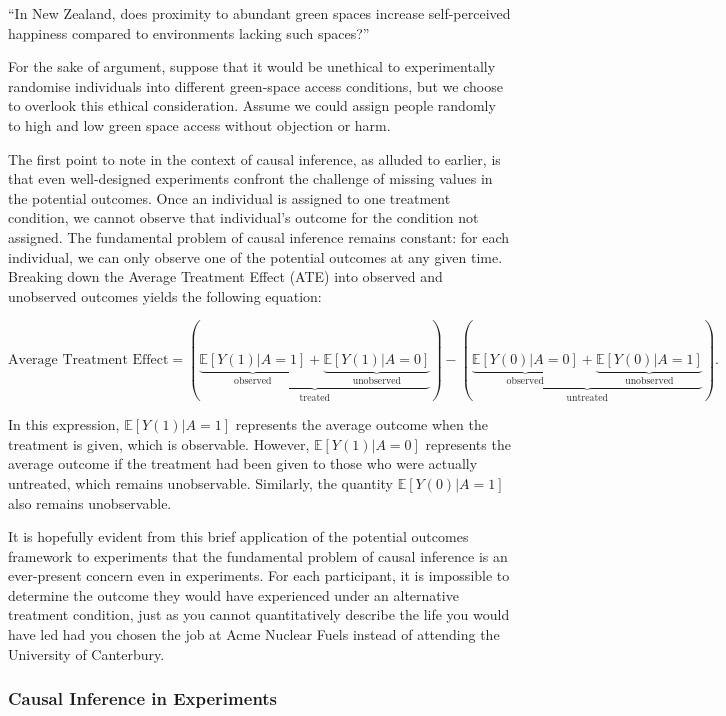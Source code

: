 \documentclass[
  singlecolumn]{article}
\begin{document}
``In New Zealand, does proximity to abundant green spaces increase
self-perceived happiness compared to environments lacking such spaces?''

For the sake of argument, suppose that it would be unethical to
experimentally randomise individuals into different green-space access
conditions, but we choose to overlook this ethical consideration. Assume
we could assign people randomly to high and low green space access
without objection or harm.

The first point to note in the context of causal inference, as alluded
to earlier, is that even well-designed experiments confront the
challenge of missing values in the potential outcomes. Once an
individual is assigned to one treatment condition, we cannot observe
that individual's outcome for the condition not assigned. The
fundamental problem of causal inference remains constant: for each
individual, we can only observe one of the potential outcomes at any
given time. Breaking down the Average Treatment Effect (ATE) into
observed and unobserved outcomes yields the following equation:

\[
\text{Average Treatment Effect} = \left(\underbrace{\underbrace{\mathbb{E}[Y(1)|A = 1]}_{\text{observed}} + \underbrace{\mathbb{E}[Y(1)|A = 0]}_{\text{unobserved}}}_{\text{treated}}\right) - \left(\underbrace{\underbrace{\mathbb{E}[Y(0)|A = 0]}_{\text{observed}} + \underbrace{\mathbb{E}[Y(0)|A = 1]}_{\text{unobserved}}}_{\text{untreated}}\right).
\]

In this expression, \(\mathbb{E}[Y(1)|A = 1]\) represents the average
outcome when the treatment is given, which is observable. However,
\(\mathbb{E}[Y(1)|A = 0]\) represents the average outcome if the
treatment had been given to those who were actually untreated, which
remains unobservable. Similarly, the quantity \(\mathbb{E}[Y(0)|A = 1]\)
also remains unobservable.

It is hopefully evident from this brief application of the potential
outcomes framework to experiments that the fundamental problem of causal
inference is an ever-present concern even in experiments. For each
participant, it is impossible to determine the outcome they would have
experienced under an alternative treatment condition, just as you cannot
quantitatively describe the life you would have led had you chosen the
job at Acme Nuclear Fuels instead of attending the University of
Canterbury.

\subsubsection{Causal Inference in
Experiments}\label{causal-inference-in-experiments}
\end{document}
